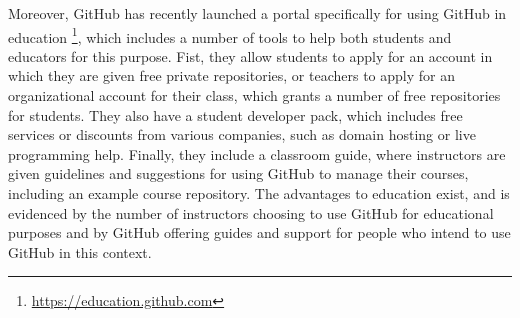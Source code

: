 Moreover, GitHub has recently launched a portal specifically for using GitHub in education \footnote{\url{https://education.github.com}}, which includes a number of tools to help both students and educators for this purpose. Fist, they allow students to apply for an account in which they are given free private repositories, or teachers to apply for an organizational account for their class, which grants a number of free repositories for students. They also have a student developer pack, which includes free services or discounts from various companies, such as domain hosting or live programming help. Finally, they include a classroom guide, where instructors are given guidelines and suggestions for using GitHub to manage their courses, including an example course repository. The advantages to education exist, and is evidenced by the number of instructors choosing to use GitHub for educational purposes and by GitHub offering guides and support for people who intend to use GitHub in this context.
